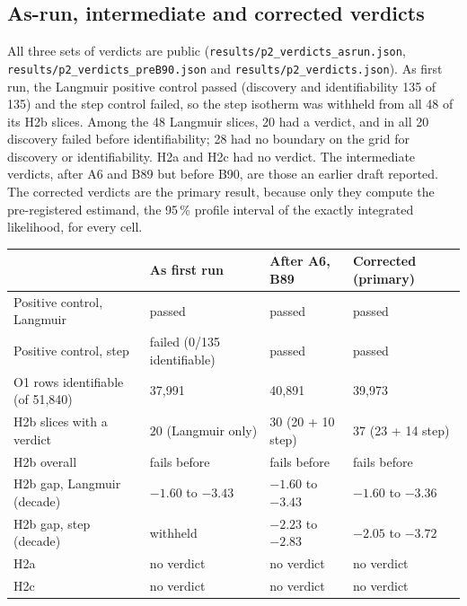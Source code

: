 \subsection*{As-run, intermediate and corrected verdicts}
\begin{sloppypar}
All three sets of verdicts are public (\texttt{results/\allowbreak p2\_verdicts\_asrun.json},
\texttt{results/\allowbreak p2\_verdicts\_preB90.json} and \texttt{results/\allowbreak p2\_verdicts.json}). As first run, the Langmuir positive control passed
(discovery and identifiability 135 of 135) and the step control failed, so the step isotherm was
withheld from all 48 of its H2b slices. Among the 48 Langmuir slices, 20 had a verdict, and in
all 20 discovery failed before identifiability; 28 had no boundary on the grid for discovery or
identifiability. H2a and H2c had no verdict. The intermediate verdicts, after A6 and B89 but
before B90, are those an earlier draft reported. The corrected verdicts are the primary result,
because only they compute the pre-registered estimand, the 95\,\% profile interval of the exactly
integrated likelihood, for every cell.
\end{sloppypar}

\begin{center}
\small
\begin{tabular}{@{}llll@{}}
\toprule
& As first run & After A6, B89 & Corrected (primary) \\
\midrule
Positive control, Langmuir & passed & passed & passed \\
Positive control, step & failed (0/135 identifiable) & passed & passed \\
O1 rows identifiable (of 51,840) & 37,991 & 40,891 & 39,973 \\
H2b slices with a verdict & 20 (Langmuir only) & 30 (20 + 10 step) & 37 (23 + 14 step) \\
H2b overall & fails before & fails before & fails before \\
H2b gap, Langmuir (decade) & $-1.60$ to $-3.43$ & $-1.60$ to $-3.43$ & $-1.60$ to $-3.36$ \\
H2b gap, step (decade) & withheld & $-2.23$ to $-2.83$ & $-2.05$ to $-3.72$ \\
H2a & no verdict & no verdict & no verdict \\
H2c & no verdict & no verdict & no verdict \\
\bottomrule
\end{tabular}
\end{center}

